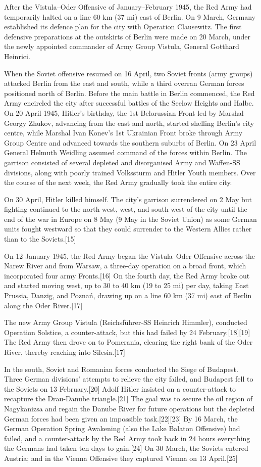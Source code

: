 After the Vistula–Oder Offensive of January–February 1945, the Red Army had temporarily halted on a line 60 km (37 mi) east of Berlin. On 9 March, Germany established its defence plan for the city with Operation Clausewitz. The first defensive preparations at the outskirts of Berlin were made on 20 March, under the newly appointed commander of Army Group Vistula, General Gotthard Heinrici.

When the Soviet offensive resumed on 16 April, two Soviet fronts (army groups) attacked Berlin from the east and south, while a third overran German forces positioned north of Berlin. Before the main battle in Berlin commenced, the Red Army encircled the city after successful battles of the Seelow Heights and Halbe. On 20 April 1945, Hitler's birthday, the 1st Belorussian Front led by Marshal Georgy Zhukov, advancing from the east and north, started shelling Berlin's city centre, while Marshal Ivan Konev's 1st Ukrainian Front broke through Army Group Centre and advanced towards the southern suburbs of Berlin. On 23 April General Helmuth Weidling assumed command of the forces within Berlin. The garrison consisted of several depleted and disorganised Army and Waffen-SS divisions, along with poorly trained Volkssturm and Hitler Youth members. Over the course of the next week, the Red Army gradually took the entire city.

On 30 April, Hitler killed himself. The city's garrison surrendered on 2 May but fighting continued to the north-west, west, and south-west of the city until the end of the war in Europe on 8 May (9 May in the Soviet Union) as some German units fought westward so that they could surrender to the Western Allies rather than to the Soviets.[15]

On 12 January 1945, the Red Army began the Vistula–Oder Offensive across the Narew River and from Warsaw, a three-day operation on a broad front, which incorporated four army Fronts.[16] On the fourth day, the Red Army broke out and started moving west, up to 30 to 40 km (19 to 25 mi) per day, taking East Prussia, Danzig, and Poznań, drawing up on a line 60 km (37 mi) east of Berlin along the Oder River.[17]

The new Army Group Vistula (Reichsführer-SS Heinrich Himmler), conducted Operation Solstice, a counter-attack, but this had failed by 24 February.[18][19] The Red Army then drove on to Pomerania, clearing the right bank of the Oder River, thereby reaching into Silesia.[17]

In the south, Soviet and Romanian forces conducted the Siege of Budapest. Three German divisions' attempts to relieve the city failed, and Budapest fell to the Soviets on 13 February.[20] Adolf Hitler insisted on a counter-attack to recapture the Drau-Danube triangle.[21] The goal was to secure the oil region of Nagykanizsa and regain the Danube River for future operations but the depleted German forces had been given an impossible task.[22][23] By 16 March, the German Operation Spring Awakening (also the Lake Balaton Offensive) had failed, and a counter-attack by the Red Army took back in 24 hours everything the Germans had taken ten days to gain.[24] On 30 March, the Soviets entered Austria; and in the Vienna Offensive they captured Vienna on 13 April.[25]

